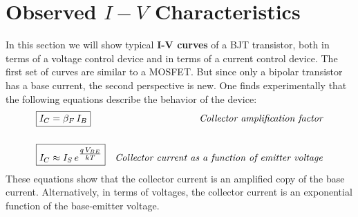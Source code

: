 \section{Observed \texorpdfstring{$I-V$}{I-V} Characteristics}
In this section we will show typical \textbf{I-V curves} of a BJT transistor, both in terms of a voltage control device and in terms of a current control device.  The first set of curves are similar to a MOSFET.  But since only a bipolar transistor has a base current, the second perspective is new.  One finds experimentally that the following equations describe the behavior of the device:
    \begin{align}
        \Aboxed{I_C &= \beta_F\,I_B} &\textit{Collector amplification factor}\\[0.5cm]
        \Aboxed{I_C &\approx I_S\,e^{\mathlarger{\frac{q\,V_{BE}}{kT}}}} &\textit{Collector current as a function of emitter voltage}
    \end{align}
These equations show that the collector current is an amplified copy of the base current.  Alternatively, in terms of voltages, the collector current is an exponential function of the base-emitter voltage.
